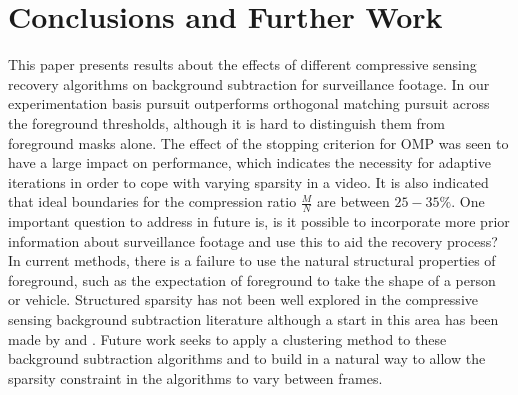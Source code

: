 \section{Conclusions and Further Work}\label{sec:conclusions}
This paper presents results about the effects of different compressive sensing recovery algorithms on background subtraction for surveillance footage. In our experimentation basis pursuit outperforms orthogonal matching pursuit across the foreground thresholds, although it is hard to distinguish them from foreground masks alone.  The effect of the stopping criterion for OMP was seen to have a large impact on performance, which indicates the necessity for adaptive iterations in order to cope with varying sparsity in a video. It is also indicated that ideal boundaries for the compression ratio $\frac{M}{N}$ are between $25 - 35\%$.  One important question to address in future is, is it possible to incorporate more prior information about surveillance footage and use this to aid the recovery process? In current methods, there is a failure to use the natural structural properties of foreground, such as the expectation of foreground to take the shape of a person or vehicle. Structured sparsity has not been well explored in the compressive sensing background subtraction literature although a start in this area has been made by \cite{La2006} and \cite{Duarte2008}. Future work seeks to apply a clustering method to these background subtraction algorithms and to build in a natural way to allow the sparsity constraint in the algorithms to vary between frames. 





